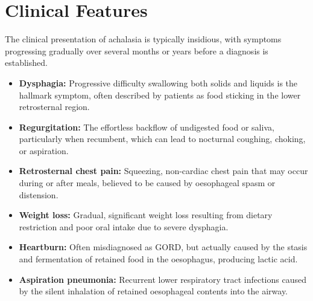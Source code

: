 \section*{Clinical Features}
The clinical presentation of achalasia is typically insidious, with symptoms progressing gradually over several months or years before a diagnosis is established.
\begin{itemize}
    \item \textbf{Dysphagia:} Progressive difficulty swallowing both solids and liquids is the hallmark symptom, often described by patients as food sticking in the lower retrosternal region.
    \item \textbf{Regurgitation:} The effortless backflow of undigested food or saliva, particularly when recumbent, which can lead to nocturnal coughing, choking, or aspiration.
    \item \textbf{Retrosternal chest pain:} Squeezing, non-cardiac chest pain that may occur during or after meals, believed to be caused by oesophageal spasm or distension.
    \item \textbf{Weight loss:} Gradual, significant weight loss resulting from dietary restriction and poor oral intake due to severe dysphagia.
    \item \textbf{Heartburn:} Often misdiagnosed as GORD, but actually caused by the stasis and fermentation of retained food in the oesophagus, producing lactic acid.
    \item \textbf{Aspiration pneumonia:} Recurrent lower respiratory tract infections caused by the silent inhalation of retained oesophageal contents into the airway.
\end{itemize}

